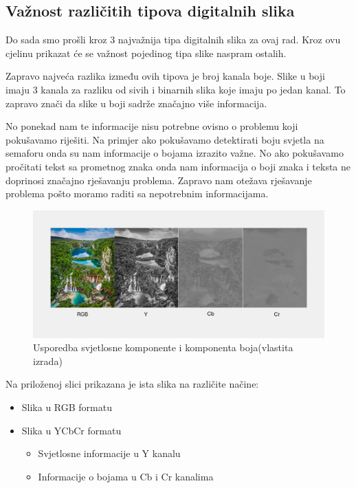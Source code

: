 \documentclass{foi}
\begin{document}
\subsection{Važnost različitih tipova digitalnih slika}

Do sada smo prošli kroz 3 najvažnija tipa digitalnih slika za ovaj rad. Kroz ovu cjelinu prikazat će se važnost pojedinog tipa slike naspram ostalih.

Zapravo najveća razlika između ovih tipova je broj kanala boje. Slike u boji imaju 3 kanala za razliku od sivih i binarnih slika koje imaju po jedan kanal. To zapravo znači da slike u boji sadrže značajno više informacija. 

No ponekad nam te informacije nisu potrebne ovisno o problemu koji pokušavamo riješiti. Na primjer ako pokušavamo detektirati boju svjetla na semaforu onda su nam informacije o bojama izrazito važne. No ako pokušavamo pročitati tekst sa prometnog znaka onda nam informacija o boji znaka i teksta ne doprinosi značajno rješavanju problema. Zapravo nam otežava rješavanje problema pošto moramo raditi sa nepotrebnim informacijama.

\begin{figure}[H]
    \centering
    \includegraphics[width=1.0\linewidth]{slike/Luminace vs chrominance.png}
    \caption{Usporedba svjetlosne komponente i komponenta boja(vlastita izrada)}
\end{figure}

\begin{flushleft}
    Na priloženoj slici prikazana je ista slika na različite načine:
    \begin{itemize}[label=•]
        \item Slika u RGB formatu
        \item Slika u YCbCr formatu
        \begin{itemize}[label=•]
            \item Svjetlosne informacije u Y kanalu
            \item Informacije o bojama u Cb i Cr kanalima
        \end{itemize}
    \end{itemize}
    \end{flushleft}
\end{document}
